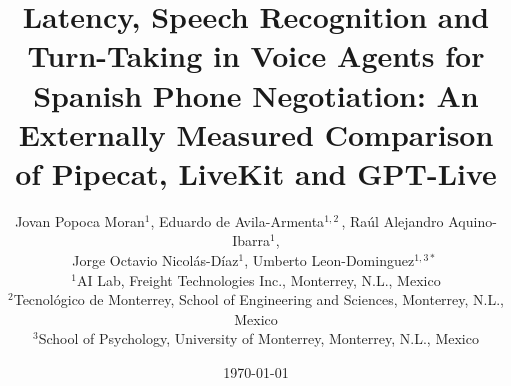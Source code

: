 \documentclass[11pt]{article}
\begin{document}
\title{Latency, Speech Recognition and Turn-Taking in Voice Agents for Spanish Phone Negotiation: An Externally Measured Comparison of Pipecat, LiveKit and GPT-Live}

\author{%
Jovan Popoca Moran$^{1}$, Eduardo de Avila-Armenta$^{1,2}$\,, Raúl Alejandro Aquino-Ibarra$^{1}$,\\
Jorge Octavio Nicolás-Díaz$^{1}$, Umberto Leon-Dominguez$^{1,3*}$\,\\[4pt]
{\normalsize $^{1}$AI Lab, Freight Technologies Inc., Monterrey, N.L., Mexico}\\
{\normalsize $^{2}$Tecnológico de Monterrey, School of Engineering and Sciences, Monterrey, N.L., Mexico}\\
{\normalsize $^{3}$School of Psychology, University of Monterrey, Monterrey, N.L., Mexico}}

\date{\today}

\maketitle

{\renewcommand{\thefootnote}{*}}
\end{document}
